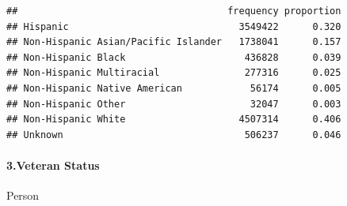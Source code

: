 \documentclass[
]{article}
\newenvironment{Shaded}{\begin{snugshade}}{\end{snugshade}}
\newcommand{\AttributeTok}[1]{\textcolor[rgb]{0.13,0.29,0.53}{#1}}
\newcommand{\CommentTok}[1]{\textcolor[rgb]{0.56,0.35,0.01}{\textit{#1}}}
\newcommand{\ConstantTok}[1]{\textcolor[rgb]{0.56,0.35,0.01}{#1}}
\newcommand{\DecValTok}[1]{\textcolor[rgb]{0.00,0.00,0.81}{#1}}
\newcommand{\FunctionTok}[1]{\textcolor[rgb]{0.13,0.29,0.53}{\textbf{#1}}}
\newcommand{\NormalTok}[1]{#1}
\newcommand{\OtherTok}[1]{\textcolor[rgb]{0.56,0.35,0.01}{#1}}
\newcommand{\SpecialCharTok}[1]{\textcolor[rgb]{0.81,0.36,0.00}{\textbf{#1}}}
\newcommand{\StringTok}[1]{\textcolor[rgb]{0.31,0.60,0.02}{#1}}
\begin{document}
\begin{Shaded}
\end{Shaded}

\begin{verbatim}
##                                     frequency proportion
## Hispanic                              3549422      0.320
## Non-Hispanic Asian/Pacific Islander   1738041      0.157
## Non-Hispanic Black                     436828      0.039
## Non-Hispanic Multiracial               277316      0.025
## Non-Hispanic Native American            56174      0.005
## Non-Hispanic Other                      32047      0.003
## Non-Hispanic White                    4507314      0.406
## Unknown                                506237      0.046
\end{verbatim}

\paragraph{3.Veteran Status}\label{veteran-status}

Person

\begin{Shaded}
\end{Shaded}
\end{document}
